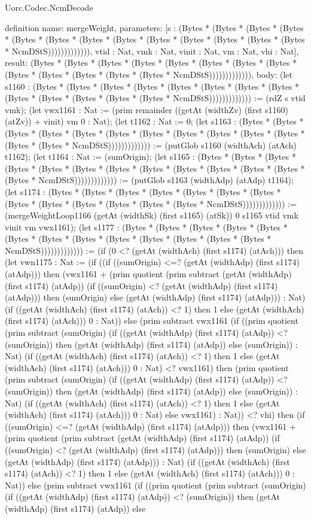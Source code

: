 \begin{lexlean}{Uorc.Codec.NcmDecode}
\begin{semanticmodule}
definition{
  name: mergeWeight,
  parameters: [s : (Bytes * (Bytes * (Bytes * (Bytes * (Bytes * (Bytes * (Bytes * (Bytes * (Bytes * (Bytes * (Bytes * (Bytes * (Bytes * NcmDStS))))))))))))), vtid : Nat, vmk : Nat, vinit : Nat, vm : Nat, vhi : Nat],
  result: (Bytes * (Bytes * (Bytes * (Bytes * (Bytes * (Bytes * (Bytes * (Bytes * (Bytes * (Bytes * (Bytes * (Bytes * (Bytes * NcmDStS))))))))))))),
  body: (let s1160 : (Bytes * (Bytes * (Bytes * (Bytes * (Bytes * (Bytes * (Bytes * (Bytes * (Bytes * (Bytes * (Bytes * (Bytes * (Bytes * NcmDStS))))))))))))) := (rdZ s vtid vmk); (let vwx1161 : Nat := (prim remainder ((getAt (widthZv) (first s1160) (atZv)) + vinit) vm 0 : Nat); (let t1162 : Nat := 0; (let s1163 : (Bytes * (Bytes * (Bytes * (Bytes * (Bytes * (Bytes * (Bytes * (Bytes * (Bytes * (Bytes * (Bytes * (Bytes * (Bytes * NcmDStS))))))))))))) := (putGlob s1160 (widthAch) (atAch) t1162); (let t1164 : Nat := (sumOrigin); (let s1165 : (Bytes * (Bytes * (Bytes * (Bytes * (Bytes * (Bytes * (Bytes * (Bytes * (Bytes * (Bytes * (Bytes * (Bytes * (Bytes * NcmDStS))))))))))))) := (putGlob s1163 (widthAdp) (atAdp) t1164); (let s1174 : (Bytes * (Bytes * (Bytes * (Bytes * (Bytes * (Bytes * (Bytes * (Bytes * (Bytes * (Bytes * (Bytes * (Bytes * (Bytes * NcmDStS))))))))))))) := (mergeWeightLoop1166 (getAt (widthSk) (first s1165) (atSk)) 0 s1165 vtid vmk vinit vm vwx1161); (let s1177 : (Bytes * (Bytes * (Bytes * (Bytes * (Bytes * (Bytes * (Bytes * (Bytes * (Bytes * (Bytes * (Bytes * (Bytes * (Bytes * NcmDStS))))))))))))) := (if (0 <? (getAt (widthAch) (first s1174) (atAch))) then (let vwn1175 : Nat := (if ((if ((sumOrigin) <=? (getAt (widthAdp) (first s1174) (atAdp))) then (vwx1161 + (prim quotient (prim subtract (getAt (widthAdp) (first s1174) (atAdp)) (if ((sumOrigin) <? (getAt (widthAdp) (first s1174) (atAdp))) then (sumOrigin) else (getAt (widthAdp) (first s1174) (atAdp))) : Nat) (if ((getAt (widthAch) (first s1174) (atAch)) <? 1) then 1 else (getAt (widthAch) (first s1174) (atAch))) 0 : Nat)) else (prim subtract vwx1161 (if ((prim quotient (prim subtract (sumOrigin) (if ((getAt (widthAdp) (first s1174) (atAdp)) <? (sumOrigin)) then (getAt (widthAdp) (first s1174) (atAdp)) else (sumOrigin)) : Nat) (if ((getAt (widthAch) (first s1174) (atAch)) <? 1) then 1 else (getAt (widthAch) (first s1174) (atAch))) 0 : Nat) <? vwx1161) then (prim quotient (prim subtract (sumOrigin) (if ((getAt (widthAdp) (first s1174) (atAdp)) <? (sumOrigin)) then (getAt (widthAdp) (first s1174) (atAdp)) else (sumOrigin)) : Nat) (if ((getAt (widthAch) (first s1174) (atAch)) <? 1) then 1 else (getAt (widthAch) (first s1174) (atAch))) 0 : Nat) else vwx1161) : Nat)) <? vhi) then (if ((sumOrigin) <=? (getAt (widthAdp) (first s1174) (atAdp))) then (vwx1161 + (prim quotient (prim subtract (getAt (widthAdp) (first s1174) (atAdp)) (if ((sumOrigin) <? (getAt (widthAdp) (first s1174) (atAdp))) then (sumOrigin) else (getAt (widthAdp) (first s1174) (atAdp))) : Nat) (if ((getAt (widthAch) (first s1174) (atAch)) <? 1) then 1 else (getAt (widthAch) (first s1174) (atAch))) 0 : Nat)) else (prim subtract vwx1161 (if ((prim quotient (prim subtract (sumOrigin) (if ((getAt (widthAdp) (first s1174) (atAdp)) <? (sumOrigin)) then (getAt (widthAdp) (first s1174) (atAdp)) else }
\end{semanticmodule}
\end{lexlean}
